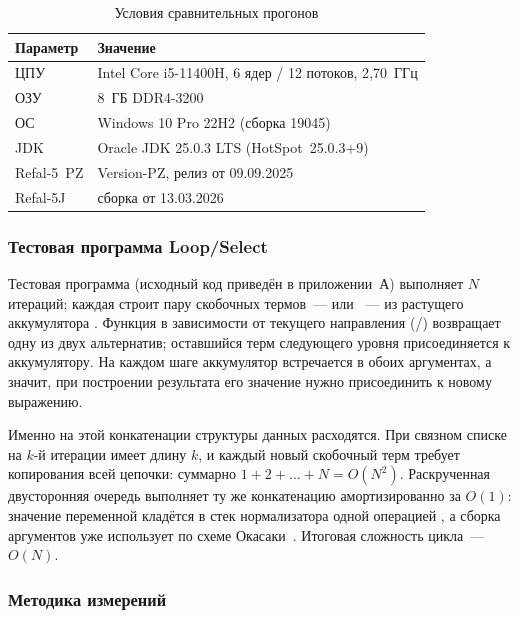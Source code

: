 \begin{table}[!htb]
\caption{\centering Условия сравнительных прогонов}
\label{tab:bench-env}
\centering
\small
\begin{tabular}{@{}lp{9cm}@{}}
\toprule
\textbf{Параметр} & \textbf{Значение} \\
\midrule
ЦПУ      & Intel Core i5-11400H, 6 ядер / 12 потоков, 2{,}70~ГГц \\
ОЗУ      & 8~ГБ DDR4-3200 \\
ОС       & Windows 10 Pro 22H2 (сборка 19045) \\
JDK      & Oracle JDK 25.0.3 LTS (HotSpot~25.0.3+9) \\
Refal-5~PZ   & Version-PZ, релиз от 09.09.2025 \\
Refal-5J     & сборка от 13.03.2026 \\
\bottomrule
\end{tabular}
\end{table}

\subsubsection{Тестовая программа Loop/Select}

Тестовая программа (исходный код приведён в приложении~А) выполняет \(N\)
итераций; каждая строит пару скобочных термов~---  или
~--- из растущего аккумулятора . Функция
 в зависимости от текущего направления (/)
возвращает одну из двух альтернатив; оставшийся терм следующего уровня
присоединяется к аккумулятору. На каждом шаге аккумулятор 
встречается в обоих аргументах, а значит, при построении результата
его значение нужно присоединить к новому выражению.

Именно на этой конкатенации структуры данных расходятся. При связном
списке  на $k$-й итерации имеет длину $k$, и каждый новый
скобочный терм требует копирования всей цепочки: суммарно
$1 + 2 + \ldots + N = O(N^2)$. Раскрученная двусторонняя очередь
выполняет ту же конкатенацию амортизированно за $O(1)$: значение
переменной кладётся в стек нормализатора одной операцией
, а сборка аргументов уже использует
 по схеме Окасаки~\cite{okasaki_pfds}. Итоговая
сложность цикла~--- $O(N)$.

\subsubsection{Методика измерений}

